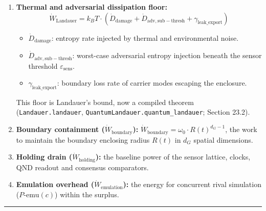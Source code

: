 \documentclass[
]{article}
\providecommand{\tightlist}{%
  \setlength{\itemsep}{0pt}\setlength{\parskip}{0pt}}
\begin{document}
\begin{enumerate}
\def\labelenumi{\arabic{enumi}.}
\tightlist
\item
  \textbf{Thermal and adversarial dissipation floor:}
  \[\dot W_{\mathrm{Landauer}} = k_B T \cdot \left(\dot D_{\mathrm{damage}} + \dot D_{\mathrm{adv,sub-thresh}} + \gamma_{\mathrm{leak\_export}}\right)\]

  \begin{itemize}
  \tightlist
  \item
    \(\dot D_{\mathrm{damage}}\): entropy rate injected by thermal and
    environmental noise.
  \item
    \(\dot D_{\mathrm{adv,sub-thresh}}\): worst-case adversarial entropy
    injection beneath the sensor threshold
    \(\varepsilon_{\mathrm{sens}}\).
  \item
    \(\gamma_{\mathrm{leak\_export}}\): boundary loss rate of carrier
    modes escaping the enclosure.
  \end{itemize}

  This floor is Landauer's bound, now a compiled theorem
  (\texttt{L\allowbreak{}a\allowbreak{}n\allowbreak{}d\allowbreak{}a\allowbreak{}u\allowbreak{}e\allowbreak{}r\allowbreak{}.\allowbreak{}l\allowbreak{}a\allowbreak{}n\allowbreak{}d\allowbreak{}a\allowbreak{}u\allowbreak{}e\allowbreak{}r},
  \texttt{Q\allowbreak{}u\allowbreak{}a\allowbreak{}n\allowbreak{}t\allowbreak{}u\allowbreak{}m\allowbreak{}L\allowbreak{}a\allowbreak{}n\allowbreak{}d\allowbreak{}a\allowbreak{}u\allowbreak{}e\allowbreak{}r\allowbreak{}.\allowbreak{}q\allowbreak{}u\allowbreak{}a\allowbreak{}n\allowbreak{}t\allowbreak{}u\allowbreak{}m\allowbreak{}\_\allowbreak{}l\allowbreak{}a\allowbreak{}n\allowbreak{}d\allowbreak{}a\allowbreak{}u\allowbreak{}e\allowbreak{}r};
  Section 23.2).
\item
  \textbf{Boundary containment (\(\dot W_{\mathrm{boundary}}\)):}
  \(\dot W_{\mathrm{boundary}} = \omega_0 \cdot R(t)^{d_G - 1}\), the
  work to maintain the boundary enclosing radius \(R(t)\) in \(d_G\)
  spatial dimensions.
\item
  \textbf{Holding drain (\(\dot W_{\mathrm{holding}}\)):} the baseline
  power of the sensor lattice, clocks, QND readout and consensus
  comparators.
\item
  \textbf{Emulation overhead (\(\dot W_{\mathrm{emulation}}\)):} the
  energy for concurrent rival simulation (\(P\text{-emu}(c)\)) within
  the surplus.
\end{enumerate}

\begin{center}\rule{0.5\linewidth}{0.5pt}\end{center}
\end{document}
